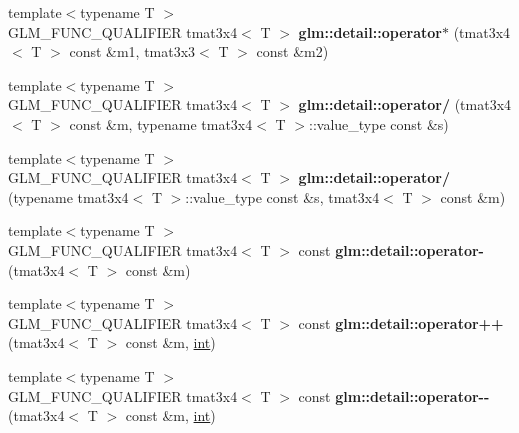 \begin{DoxyCompactItemize}
\item 
\hypertarget{namespaceglm_1_1detail_a22bc5963c1f83e2d549abef9253f7fc4}{}{\footnotesize template$<$typename T $>$ }\\G\+L\+M\+\_\+\+F\+U\+N\+C\+\_\+\+Q\+U\+A\+L\+I\+F\+I\+E\+R tmat3x4$<$ T $>$ {\bfseries glm\+::detail\+::operator$\ast$} (tmat3x4$<$ T $>$ const \&m1, tmat3x3$<$ T $>$ const \&m2)\label{namespaceglm_1_1detail_a22bc5963c1f83e2d549abef9253f7fc4}

\item 
\hypertarget{namespaceglm_1_1detail_af44f69b4557cd3251715e75169a1ff32}{}{\footnotesize template$<$typename T $>$ }\\G\+L\+M\+\_\+\+F\+U\+N\+C\+\_\+\+Q\+U\+A\+L\+I\+F\+I\+E\+R tmat3x4$<$ T $>$ {\bfseries glm\+::detail\+::operator/} (tmat3x4$<$ T $>$ const \&m, typename tmat3x4$<$ T $>$\+::value\+\_\+type const \&s)\label{namespaceglm_1_1detail_af44f69b4557cd3251715e75169a1ff32}

\item 
\hypertarget{namespaceglm_1_1detail_a133f8fff58a9e20686dfe57e38ad4bf7}{}{\footnotesize template$<$typename T $>$ }\\G\+L\+M\+\_\+\+F\+U\+N\+C\+\_\+\+Q\+U\+A\+L\+I\+F\+I\+E\+R tmat3x4$<$ T $>$ {\bfseries glm\+::detail\+::operator/} (typename tmat3x4$<$ T $>$\+::value\+\_\+type const \&s, tmat3x4$<$ T $>$ const \&m)\label{namespaceglm_1_1detail_a133f8fff58a9e20686dfe57e38ad4bf7}

\item 
\hypertarget{namespaceglm_1_1detail_a9f66509dfdc347b11905529b91f4c6e0}{}{\footnotesize template$<$typename T $>$ }\\G\+L\+M\+\_\+\+F\+U\+N\+C\+\_\+\+Q\+U\+A\+L\+I\+F\+I\+E\+R tmat3x4$<$ T $>$ const {\bfseries glm\+::detail\+::operator-\/} (tmat3x4$<$ T $>$ const \&m)\label{namespaceglm_1_1detail_a9f66509dfdc347b11905529b91f4c6e0}

\item 
\hypertarget{namespaceglm_1_1detail_a8e5ec373b9d53569ce683de9047fea28}{}{\footnotesize template$<$typename T $>$ }\\G\+L\+M\+\_\+\+F\+U\+N\+C\+\_\+\+Q\+U\+A\+L\+I\+F\+I\+E\+R tmat3x4$<$ T $>$ const {\bfseries glm\+::detail\+::operator++} (tmat3x4$<$ T $>$ const \&m, \hyperlink{_s_d_l__thread_8h_a6a64f9be4433e4de6e2f2f548cf3c08e}{int})\label{namespaceglm_1_1detail_a8e5ec373b9d53569ce683de9047fea28}

\item 
\hypertarget{namespaceglm_1_1detail_a029b4b50b30ba98970ffaeec158cf198}{}{\footnotesize template$<$typename T $>$ }\\G\+L\+M\+\_\+\+F\+U\+N\+C\+\_\+\+Q\+U\+A\+L\+I\+F\+I\+E\+R tmat3x4$<$ T $>$ const {\bfseries glm\+::detail\+::operator-\/-\/} (tmat3x4$<$ T $>$ const \&m, \hyperlink{_s_d_l__thread_8h_a6a64f9be4433e4de6e2f2f548cf3c08e}{int})\label{namespaceglm_1_1detail_a029b4b50b30ba98970ffaeec158cf198}


\end{DoxyCompactItemize}
